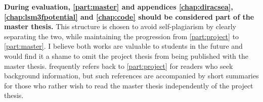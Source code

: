\textbf{During evaluation, \cref{part:master} and appendices \ref{chap:diracsea}, \ref{chap:lsm3fpotential} and \ref{chap:code} should be considered part of the master thesis.}
This structure is chosen to avoid self-plagiarism by clearly separating the two,
while maintaining the progression from \cref{part:project} to \cref{part:master}.
I believe both works are valuable to students in the future and would find it a shame to omit the project thesis from being published with the master thesis.
 frequently refers back to \cref{part:project} for readers who seek background information,
but such references are accompanied by short summaries for those who rather wish to read the master thesis independently of the project thesis.

\mbox{}\vfill
\begin{center}
\end{center}
